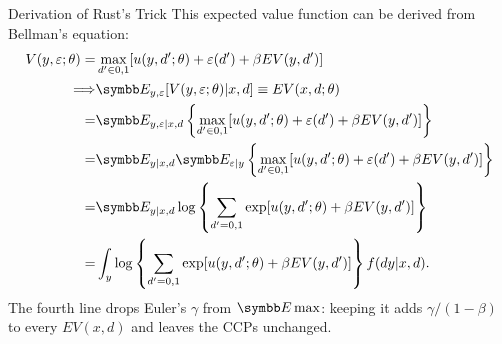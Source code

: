 \documentclass[aspectratio=169,11pt]{beamer}
\begin{document}
\begin{frame}{Derivation of Rust's Trick}
\footnotesize
This \alert{expected value function} can be derived from Bellman's equation:
\begin{align*}
\begin{split}
V(y, \varepsilon ;\theta) = & \max_{d' \in 0,1} [ u(y, d' ; \theta) + \varepsilon(d') + \beta EV(y,d')] \\
\Longrightarrow & \E_{y, \varepsilon} [V(y, \varepsilon ; \theta) | x, d ] \equiv  EV(x, d ; \theta) \\
= & \E_{y, \varepsilon | x, d } \left \{ \max_{ d' \in 0,1} [ u(y, d' ; \theta) + \varepsilon(d') + \beta EV(y,d')] \right \} \\
= &  \E_{y | x, d }  \E_{\varepsilon | y } \left \{ \max_{ d' \in 0,1} [ u(y, d' ; \theta) + \varepsilon(d') + \beta EV(y,d')] \right \} \\
= &  \E_{y | x, d } \log \left \{ \sum_{d'=0,1} \exp [ u(y, d' ; \theta)  + \beta EV(y,d')] \right \} \\
= & \int_y \log  \left \{ \sum_{d'=0,1} \exp [ u(y, d' ; \theta)  + \beta EV(y,d')] \right \} f(dy|x,d).
\end{split}
\end{align*}
The fourth line drops Euler's $\gamma$ from $\E \max$: keeping it adds $\gamma/(1-\beta)$ to every $EV(x,d)$ and leaves the CCPs unchanged.
\end{frame}
%
\end{document}
